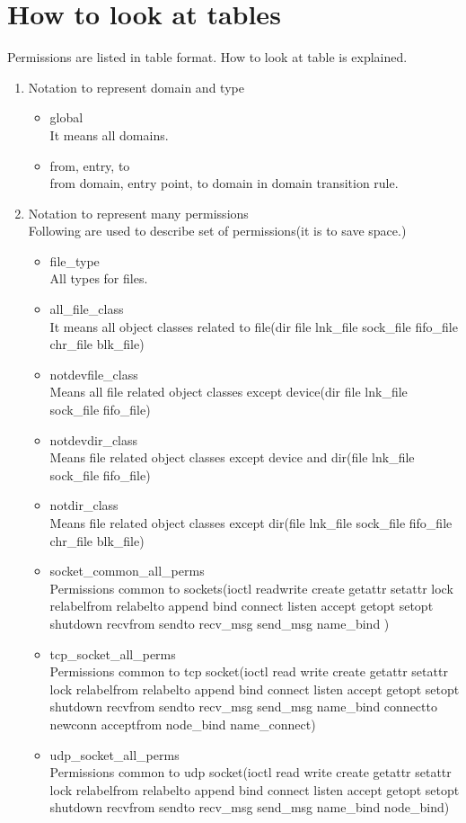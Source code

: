 \documentclass{article}
\begin{document}
\section{How to look at tables}
Permissions are listed in table format. How to look at table is explained.
\begin{enumerate}
 \item Notation to represent domain and type\\
       \begin{itemize}
	\item global\\
	      It means all domains.
	\item from,  entry, to\\	      
	      from domain, entry point, to domain in domain transition rule.
       \end{itemize}
 \item Notation to represent many permissions\\
       Following are used to describe set of permissions(it is to save space.)
       \begin{itemize}
	\item file\_type\\
	      All types for files.
       \item all\_file\_class\\
	     It means all object classes related to file(dir file
	     lnk\_file sock\_file fifo\_file chr\_file blk\_file)
	\item notdevfile\_class\\
	     Means all file related object classes except device(dir
	     file lnk\_file sock\_file fifo\_file)
	\item notdevdir\_class\\
	     Means file related object classes except device and dir(file lnk\_file sock\_file fifo\_file)
	\item notdir\_class\\
	     Means file related object classes except dir(file lnk\_file
	     sock\_file fifo\_file chr\_file blk\_file)
	\item socket\_common\_all\_perms\\
	     Permissions common to sockets(ioctl readwrite create
	     getattr setattr lock relabelfrom relabelto append bind
	     connect listen accept getopt setopt shutdown recvfrom
	     sendto recv\_msg send\_msg name\_bind )
	\item tcp\_socket\_all\_perms\\
	     Permissions common to tcp socket(ioctl read write create getattr setattr lock relabelfrom relabelto append bind connect listen accept getopt setopt shutdown recvfrom sendto recv\_msg send\_msg name\_bind connectto newconn acceptfrom node\_bind name\_connect)
	\item udp\_socket\_all\_perms\\
	     Permissions common to udp socket(ioctl read	write create getattr setattr lock relabelfrom relabelto append bind connect listen accept getopt setopt shutdown recvfrom sendto recv\_msg send\_msg name\_bind node\_bind)
       \end{itemize}


\end{enumerate}
\end{document}
